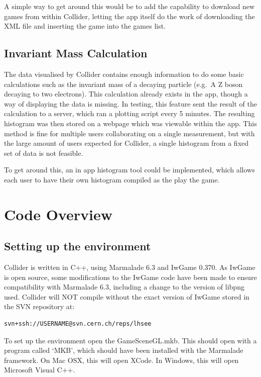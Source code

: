 \documentclass[12pt]{article}
\begin{document}
A simple way to get around this would be to add the capability to download new games from within Collider, letting the app itself do 
the work of downloading the XML file and inserting the game into the games list.

\subsection{Invariant Mass Calculation}
The data visualised by Collider contains enough information to do some basic calculations such as the invariant mass of a decaying 
particle (e.g.~A Z boson decaying to two electrons). This calculation already exists in the app, though a way of displaying the data is missing.
In testing, this feature sent the result of the calculation to a server, which ran a plotting script every 5 minutes. The resulting histogram was then stored on a webpage which was viewable within the app.
This method is fine for multiple users collaborating on a single measurement, but with the large amount of users expected for Collider, 
a single histogram from a fixed set of data is not feasible.

To get around this, an in app histogram tool could be implemented, which allows each user to have their own histogram compiled as the play the game.


\section{Code Overview}
\label{app:code}
\subsection{Setting up the environment}
Collider is written in C++, using Marmalade 6.3 and IwGame 0.370. As IwGame is open source, some modifications to the IwGame code have been made to ensure compatibility with Marmalade 6.3, including a change to the version of libpng used. Collider will NOT compile without the exact version of IwGame stored in the SVN repository at:
\begin{verbatim}
svn+ssh://USERNAME@svn.cern.ch/reps/lhsee
\end{verbatim}

To set up the environment open the GameSceneGL.mkb. This should open with a program called `MKB', which should have been installed with the Marmalade framework. On Mac OSX, this will open XCode. In Windows, this will open Microsoft Visual C++.
\end{document}

